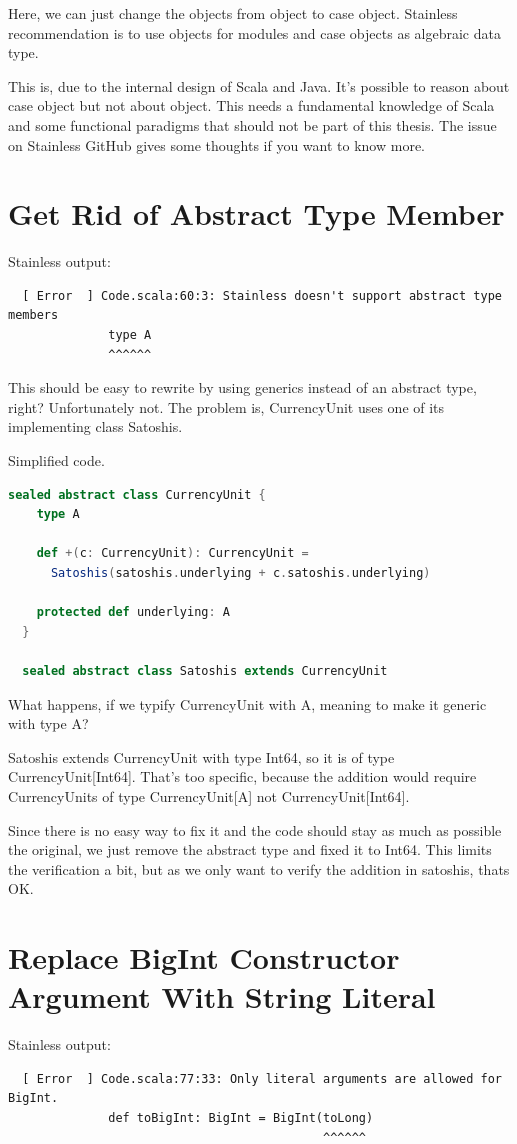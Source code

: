 Here, we can just change the objects from object to case object.
Stainless recommendation is to use objects for modules and case objects as algebraic data type.

This is, due to the internal design of Scala and Java.
It's possible to reason about case object but not about object.
This needs a fundamental knowledge of Scala and some functional paradigms that should not be part of this thesis.
The issue  on Stainless GitHub gives some thoughts if you want to know more.


\section{Get Rid of Abstract Type Member}

Stainless output:
{\footnotesize\begin{verbatim}
  [ Error  ] Code.scala:60:3: Stainless doesn't support abstract type members
              type A
              ^^^^^^
\end{verbatim}}

This should be easy to rewrite by using generics instead of an abstract type, right?
Unfortunately not.
The problem is, CurrencyUnit uses one of its implementing class Satoshis.

Simplified code.
\begin{lstlisting}[language=scala]
  sealed abstract class CurrencyUnit {
    type A

    def +(c: CurrencyUnit): CurrencyUnit =
      Satoshis(satoshis.underlying + c.satoshis.underlying)

    protected def underlying: A
  }

  sealed abstract class Satoshis extends CurrencyUnit
\end{lstlisting}

What happens, if we typify CurrencyUnit with A, meaning to make it generic with type A?

Satoshis extends CurrencyUnit with type Int64, so it is of type CurrencyUnit[Int64].
That's too specific, because the addition would require CurrencyUnits of type CurrencyUnit[A] not CurrencyUnit[Int64].

Since there is no easy way to fix it and the code should stay as much as possible the original, we just remove the abstract type and fixed it to Int64.
This limits the verification a bit, but as we only want to verify the addition in satoshis, thats OK.


\section{Replace BigInt Constructor Argument With String Literal}
Stainless output:
{\footnotesize\begin{verbatim}
  [ Error  ] Code.scala:77:33: Only literal arguments are allowed for BigInt.
              def toBigInt: BigInt = BigInt(toLong)
                                            ^^^^^^
\end{verbatim}}

